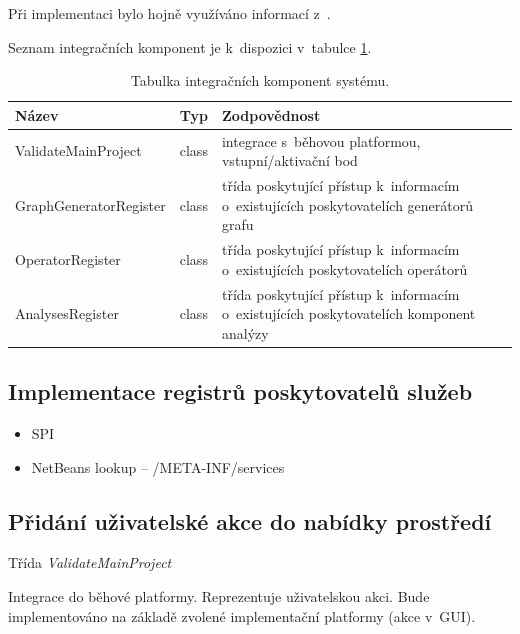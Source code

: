Při implementaci bylo hojně využíváno informací z~\cite{netbeans_platform}.

Seznam integračních komponent je k~dispozici v~tabulce \ref{implementation-integration_components}.

\begin{table}
  \caption{Tabulka integračních komponent systému. \label{implementation-integration_components}}
  \begin{center}
    \begin{tabular}{ | l | l | p{8cm} | }
      \hline
      \textbf{Název} & \textbf{Typ} & \textbf{Zodpovědnost} \\
      \hline
      \hline
      ValidateMainProject & class & integrace s~běhovou platformou, vstupní/aktivační bod \\ \hline
      GraphGeneratorRegister & class & třída poskytující přístup k~informacím o~existujících poskytovatelích generátorů grafu \\ \hline
      OperatorRegister & class & třída poskytující přístup k~informacím o~existujících poskytovatelích operátorů \\ \hline
      AnalysesRegister & class & třída poskytující přístup k~informacím o~existujících poskytovatelích komponent analýzy \\ \hline
    \end{tabular}
  \end{center}
\end{table}

\subsection{Implementace registrů poskytovatelů služeb}
\begin{itemize}
\item SPI
\item NetBeans lookup -- /META-INF/services
\end{itemize}

\subsection{Přidání uživatelské akce do nabídky prostředí}
Třída \emph{ValidateMainProject}

Integrace do běhové platformy. Reprezentuje uživatelskou akci. Bude implementováno na základě zvolené implementační platformy (akce v~GUI).

